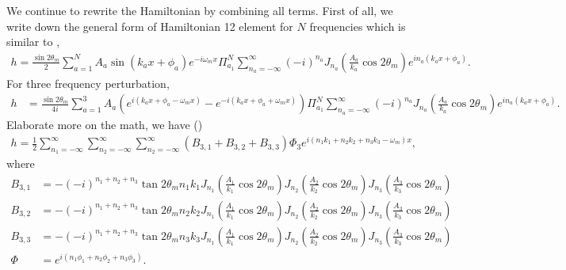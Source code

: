 \documentclass[letterpaper,12pt,english]{sphinxmanual}
\begin{document}
We continue to rewrite the Hamiltonian by combining all terms. First of all, we write down the general form of Hamiltonian 12 element for \(N\) frequencies which is similar to {\hyperref[\detokenize{matter-stimulated/two-frequency:two-frequency-equation-stimulated-multi-freq-hamiltonian-12-element}]{}},
\begin{equation*}
\begin{split}h = \frac{\sin 2\theta_m}{2}\sum_{a=1}^{N}A_a\sin(k_a x + \phi_a) e^{-i\omega_m  x} \Pi_{a_1}^N \sum_{n_a=-\infty}^{\infty} (-i)^{n_a} J_{n_a}(\frac{A_a}{k_a}\cos 2\theta_m) e^{i n_a ( k_a x + \phi_a)} .\end{split}
\end{equation*}
For three frequency perturbation,
\begin{equation*}
\begin{split}h &= \frac{\sin 2\theta_m}{4i}\sum_{a=1}^{3}A_a( e^{i(k_a x + \phi_a - \omega_m x)} - e^{-i(k_a x + \phi_a + \omega_m x)} )  \Pi_{a_1}^N \sum_{n_a=-\infty}^{\infty} (-i)^{n_a} J_{n_a}(\frac{A_a}{k_a}\cos 2\theta_m) e^{i n_a ( k_a x + \phi_a)} .\end{split}
\end{equation*}
Elaborate more on the math, we have ()
\begin{equation*}
\begin{split}h = \frac{1}{2}\sum_{n_1=-\infty}^\infty \sum_{n_2=-\infty}^\infty \sum_{n_2=-\infty}^\infty \left( B_{3,1} + B_{3,2} + B_{3,3} \right) \Phi_3 e^{i(n_1 k_1 +n_2 k_2 + n_3 k_3 -\omega_m)x},\end{split}
\end{equation*}
where
\begin{equation*}
\begin{split}B_{3,1} &= - (-i)^{n_1+n_2+n_3} \tan 2\theta_m  n_1 k_1 J_{n_1}(\frac{A_1}{k_1}\cos 2\theta_m)J_{n_2}(\frac{A_2}{k_2}\cos 2\theta_m)J_{n_3}(\frac{A_3}{k_3}\cos 2\theta_m) \\
B_{3,2} & =  - (-i)^{n_1+n_2+n_3}  \tan 2\theta_m  n_2 k_2 J_{n_1}(\frac{A_1}{k_1}\cos 2\theta_m)J_{n_2}(\frac{A_2}{k_2}\cos 2\theta_m)J_{n_3}(\frac{A_3}{k_3}\cos 2\theta_m) \\
B_{3,3} & =  - (-i)^{n_1+n_2+n_3} \tan 2\theta_m  n_3 k_3 J_{n_1}(\frac{A_1}{k_1}\cos 2\theta_m)J_{n_2}(\frac{A_2}{k_2}\cos 2\theta_m)J_{n_3}(\frac{A_3}{k_3}\cos 2\theta_m)\\
\Phi &= e^{i(n_1\phi_1 + n_2\phi_2+n_3\phi_3)}.\end{split}
\end{equation*}
\end{document}
